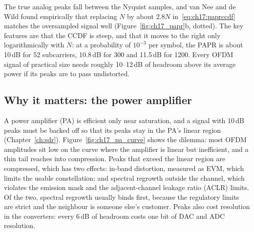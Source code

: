 The true analog peaks fall between the Nyquist samples, and van Nee and de Wild found empirically that
replacing $N$ by about $2.8N$ in~\eqref{eq:ch17:paprccdf} matches the oversampled signal well
(Figure~\ref{fig:ch17_papr}b, dotted). The key features are that the CCDF is steep, and that it moves to the right
only logarithmically with $N$: at a probability of $10^{-3}$ per symbol, the PAPR is about 10\,dB for 52
subcarriers, 10.8\,dB for 300 and 11.5\,dB for 1200. Every OFDM signal of practical size needs roughly 10--12\,dB
of headroom above its average power if its peaks are to pass undistorted.

\subsection{Why it matters: the power amplifier}

A power amplifier (PA) is efficient only near saturation, and a signal with 10\,dB peaks must be backed off so
that its peaks stay in the PA's linear region (Chapter~\ref{ch:sdr}). Figure~\ref{fig:ch17_pa_curve} shows the
dilemma: most OFDM amplitudes sit low on the curve where the amplifier is linear but inefficient, and a
thin tail reaches into compression. Peaks that exceed the linear region are compressed, which has two effects:
in-band distortion, measured as EVM, which limits the usable constellation; and spectral regrowth outside the
channel, which violates the emission mask and the adjacent-channel leakage ratio (ACLR) limits. Of the two,
spectral regrowth usually binds first, because the regulatory limits are strict and the neighbour is someone
else's customer. Peaks also cost resolution in the converters: every 6\,dB of headroom costs one bit of DAC and
ADC resolution.


